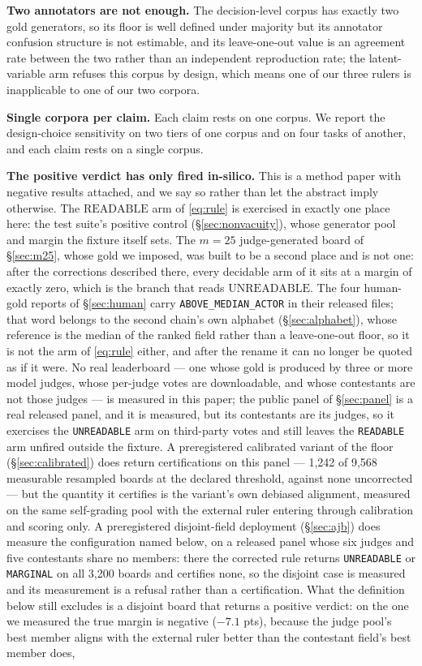 \documentclass{article}
\begin{document}
\textbf{Two annotators are not enough.} The decision-level corpus has exactly two gold generators, so its floor is well defined under majority but its annotator confusion structure is not estimable, and its leave-one-out value is an agreement rate between the two rather than an independent reproduction rate; the latent-variable arm refuses this corpus by design, which means one of our three rulers is inapplicable to one of our two corpora.

\textbf{Single corpora per claim.} Each claim rests on one corpus. We report the design-choice sensitivity on two tiers of one corpus and on four tasks of another, and each claim rests on a single corpus.

\textbf{The positive verdict has only fired in-silico.} This is a method paper with negative results attached, and we say so rather than let the abstract imply otherwise. The $\mathrm{READABLE}$ arm of \eqref{eq:rule} is exercised in exactly one place here: the test suite's positive control (\S\ref{sec:nonvacuity}), whose generator pool and margin the fixture itself sets. The $m=25$ judge-generated board of \S\ref{sec:m25}, whose gold we imposed, was built to be a second place and is not one: after the corrections described there, every decidable arm of it sits at a margin of exactly zero, which is the branch that reads $\mathrm{UNREADABLE}$. The four human-gold reports of \S\ref{sec:human} carry \texttt{ABOVE\_MEDIAN\_ACTOR} in their released files; that word belongs to the second chain's own alphabet (\S\ref{sec:alphabet}), whose reference is the median of the ranked field rather than a leave-one-out floor, so it is not the arm of \eqref{eq:rule} either, and after the rename it can no longer be quoted as if it were. No real leaderboard --- one whose gold is produced by three or more model judges, whose per-judge votes are downloadable, and whose contestants are not those judges --- is measured in this paper; the public panel of \S\ref{sec:panel} is a real released panel, and it is measured, but its contestants are its judges, so it exercises the \texttt{UNREADABLE} arm on third-party votes and still leaves the \texttt{READABLE} arm unfired outside the fixture. A preregistered calibrated variant of the floor (\S\ref{sec:calibrated}) does return certifications on this panel --- 1,242 of 9,568 measurable resampled boards at the declared threshold, against none uncorrected --- but the quantity it certifies is the variant's own debiased alignment, measured on the same self-grading pool with the external ruler entering through calibration and scoring only. A preregistered disjoint-field deployment (\S\ref{sec:ajb}) does measure the configuration named below, on a released panel whose six judges and five contestants share no members: there the corrected rule returns \texttt{UNREADABLE} or \texttt{MARGINAL} on all 3,200 boards and certifies none, so the disjoint case is measured and its measurement is a refusal rather than a certification. What the definition below still excludes is a disjoint board that returns a positive verdict: on the one we measured the true margin is negative ($-7.1$ pts), because the judge pool's best member aligns with the external ruler better than the contestant field's best member does, 
\end{document}
